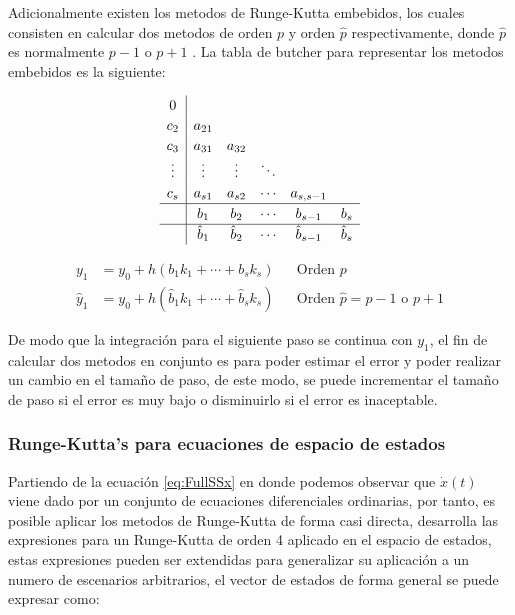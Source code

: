         Adicionalmente existen los metodos de Runge-Kutta embebidos, los cuales consisten en calcular dos metodos de orden $p$ y orden $\hat{p}$ respectivamente, donde $\hat{p}$ es normalmente $p-1$ o $p+1$ \Parencite{hairer1991solving}. La tabla de butcher para representar los metodos embebidos es la siguiente:

        \begin{equation}\label{eq:embebidoButcher}
            \renewcommand\arraystretch{1.2}
            \begin{array}
            {c|ccccc}
            0\\
            c_2 & a_{21}\\
            c_3 & a_{31} & a_{32}\\
            \vdots & \vdots & \vdots & \ddots\\
            c_s & a_{s1} & a_{s2} & \cdots & a_{s,s-1}\\
            \hline
            & b_1 & b_2 & \cdots & b_{s-1} &  b_{s}\\
            \hline
            & \hat{b}_1 & \hat{b}_2 & \cdots & \hat{b}_{s-1} &  \hat{b}_{s}
            \end{array}
        \end{equation}

        \begin{align}
            y_1 &= y_0 + h(b_1 k_1 + \cdots + b_s k_s) & &\text{Orden $p$}\\
            \hat{y}_1 &= y_0 + h(\hat{b}_1 k_1 + \cdots +\hat{b}_s k_s) & &\text{Orden $\hat{p} = p-1$ o $p+1$}
        \end{align}

        De modo que la integración para el siguiente paso se continua con $y_1$, el fin de calcular dos metodos en conjunto es para poder estimar el error y poder realizar un cambio en el tamaño de paso, de este modo, se puede incrementar el tamaño de paso si el error es muy bajo o disminuirlo si el error es inaceptable.
        
        \subsubsection{Runge-Kutta's para ecuaciones de espacio de estados}

            Partiendo de la ecuación \cref{eq:FullSSx} en donde podemos observar que $\dot{x}(t)$ viene dado por un conjunto de ecuaciones diferenciales ordinarias, por tanto, es posible aplicar los metodos de Runge-Kutta de forma casi directa, \textcite{horacio1997metodos} desarrolla las expresiones para un Runge-Kutta de orden 4 aplicado en el espacio de estados, estas expresiones pueden ser extendidas para generalizar su aplicación a un numero de escenarios arbitrarios, el vector de estados de forma general se puede expresar como:

